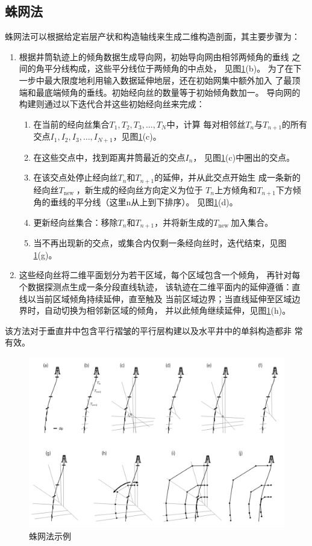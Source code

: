 \documentclass[a4paper,twoside]{ctexart}
\begin{document}
\subsection{蛛网法}
\label{sec:蛛网法}
蛛网法可以根据给定岩层产状和构造轴线来生成二维构造剖面，其主要步骤为：
\begin{enumerate}
\item 根据井筒轨迹上的倾角数据生成导向网，初始导向网由相邻两倾角的垂线
  之间的角平分线构成，这些平分线位于两倾角的中点处，
  见图\ref{fig:蛛网法}(b)。
  为了在下一步中最大限度地利用输入数据延伸地层，还在初始网集中额外加入
  了最顶端和最底端倾角的垂线。初始经向丝的数量等于初始倾角数加一。
  导向网的构建则通过以下迭代合并这些初始经向丝来完成：
  \begin{enumerate}[步骤1:]
  \item 在当前的经向丝集合$T_{1}, T_{2}, T_{3}, \ldots, T_{N}$中，计算
    每对相邻丝$T_{n}$与$T_{n+1}$的所有交点$I_{1}, I_{2}, I_{3},
    \ldots, I_{N+1} $，见图\ref{fig:蛛网法}(c)。 
  \item 在这些交点中，找到距离井筒最近的交点$I_{n}$，
    见图\ref{fig:蛛网法}(c)中圈出的交点。
  \item 在该交点处停止经向丝$T_{n}$和$T_{n+1}$的延伸，并从此交点开始生
    成一条新的经向丝$T_{\text {new }}$，新生成的经向丝方向定义为位于
    $T_n$上方倾角和$T_{n+1}$下方倾角的垂线的平分线（这里n从上到下排序）。
    见图\ref{fig:蛛网法}(d)。 
  \item 更新经向丝集合：移除$T_{n}$和$T_{n+1}$，并将新生成的$T_{\text
      {new }}$加入集合。 
  \item 当不再出现新的交点，或集合内仅剩一条经向丝时，迭代结束，见图
    \ref{fig:蛛网法}(g)。
  \end{enumerate}
  \item  
    这些经向丝将二维平面划分为若干区域，每个区域包含一个倾角，
    再针对每个数据探测点生成一条分段直线轨迹，
    该轨迹在二维平面内的延伸遵循：直线以当前区域倾角持续延伸，直至触及
    当前区域边界；当直线延伸至区域边界时，自动切换为相邻新区域的倾角，
    并以此倾角继续延伸，见图\ref{fig:蛛网法}(h)。
  \end{enumerate}
  该方法对于垂直井中包含平行褶皱的平行层构建以及水平井中的单斜构造都非
  常有效。

 \begin{figure}[htbp]
  \centering
    \includegraphics[width=\textwidth]{pic/蛛网法.png}
  \caption{蛛网法示例}
  \label{fig:蛛网法}
\end{figure}
\end{document}
